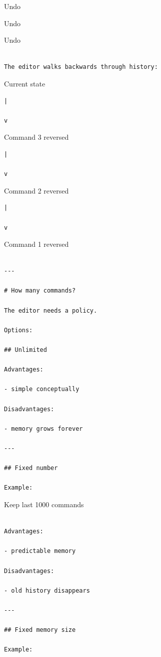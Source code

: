 \documentclass[
  oneside,
  openany]{book}
\begin{document}
Undo

Undo

Undo

\begin{verbatim}

The editor walks backwards through history:
\end{verbatim}

Current state

\begin{verbatim}
|

v
\end{verbatim}

Command 3 reversed

\begin{verbatim}
|

v
\end{verbatim}

Command 2 reversed

\begin{verbatim}
|

v
\end{verbatim}

Command 1 reversed

\begin{verbatim}

---

# How many commands?

The editor needs a policy.

Options:

## Unlimited

Advantages:

- simple conceptually

Disadvantages:

- memory grows forever

---

## Fixed number

Example:
\end{verbatim}

Keep last 1000 commands

\begin{verbatim}

Advantages:

- predictable memory

Disadvantages:

- old history disappears

---

## Fixed memory size

Example:
\end{verbatim}
\end{document}
